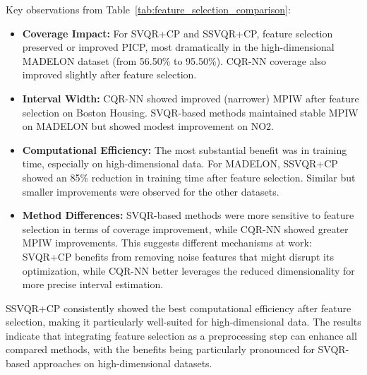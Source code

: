 \documentclass{article}
\begin{document}
Key observations from Table~\ref{tab:feature_selection_comparison}:

\begin{itemize}[noitemsep, topsep=0pt]
    \item \textbf{Coverage Impact:} For SVQR+CP and SSVQR+CP, feature selection preserved or improved PICP, most dramatically in the high-dimensional MADELON dataset (from 56.50\% to 95.50\%). CQR-NN coverage also improved slightly after feature selection.
    
    \item \textbf{Interval Width:} CQR-NN showed improved (narrower) MPIW after feature selection on Boston Housing. SVQR-based methods maintained stable MPIW on MADELON but showed modest improvement on NO2.
    
    \item \textbf{Computational Efficiency:} The most substantial benefit was in training time, especially on high-dimensional data. For MADELON, SSVQR+CP showed an 85\% reduction in training time after feature selection. Similar but smaller improvements were observed for the other datasets.
    
    \item \textbf{Method Differences:} SVQR-based methods were more sensitive to feature selection in terms of coverage improvement, while CQR-NN showed greater MPIW improvements. This suggests different mechanisms at work: SVQR+CP benefits from removing noise features that might disrupt its optimization, while CQR-NN better leverages the reduced dimensionality for more precise interval estimation.
\end{itemize}

SSVQR+CP consistently showed the best computational efficiency after feature selection, making it particularly well-suited for high-dimensional data. The results indicate that integrating feature selection as a preprocessing step can enhance all compared methods, with the benefits being particularly pronounced for SVQR-based approaches on high-dimensional datasets.
\end{document}
